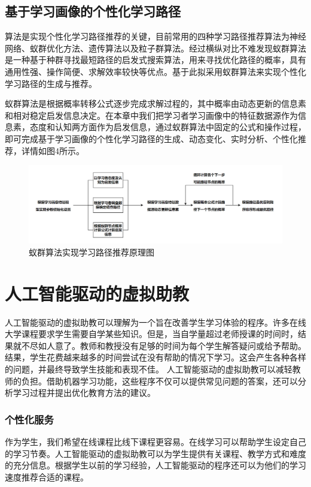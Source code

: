 \documentclass[UTF8]{ctexart}
\begin{document}
	\subsection{基于学习画像的个性化学习路径}
		算法是实现个性化学习路径推荐的关键，目前常用的四种学习路径推荐算法为神经网络、蚁群优化方法、遗传算法以及粒子群算法。经过横纵对比不难发现蚁群算法是一种基于种群寻找最短路径的启发式搜索算法，用来寻找优化路径的概率，具有通用性强、操作简便、求解效率较快等优点。基于此拟采用蚁群算法来实现个性化学习路径的生成与推荐。

		蚁群算法是根据概率转移公式逐步完成求解过程的，其中概率由动态更新的信息素和相对稳定启发信息决定。在本章中我们把学习者学习画像中的特征数据源作为信息素，态度和认知两方面作为启发信息，通过蚁群算法中固定的公式和操作过程，即可完成基于学习画像的个性化学习路径的生成、动态变化、实时分析、个性化推荐，详情如图4所示。
		\begin{figure}[H]
			\centering
			\includegraphics[width=1\textwidth]{yiqun}
			\caption{蚁群算法实现学习路径推荐原理图}
			\end{figure}

	\section{人工智能驱动的虚拟助教}
	人工智能驱动的虚拟助教可以理解为一个旨在改善学生学习体验的程序。许多在线大学课程要求学生需要自学某些知识。但是，当自学量超过老师授课的时间时，结果就不尽如人意了。教师和教授没有足够的时间为每个学生解答疑问或给予帮助。结果，学生花费越来越多的时间尝试在没有帮助的情况下学习。这会产生各种各样的问题，并最终导致学生技能和表现不佳。
	人工智能驱动的虚拟助教可以减轻教师的负担。借助机器学习功能，这些程序不仅可以提供常见问题的答案，还可以分析学习过程并提出优化教育方法的建议。
		\subsubsection{个性化服务}
		作为学生，我们希望在线课程比线下课程更容易。在线学习可以帮助学生设定自己的学习节奏。人工智能驱动的虚拟助教可以为学生提供有关课程、教学方式和难度的充分信息。根据学生以前的学习经验，人工智能驱动的程序还可以为他们的学习速度推荐合适的课程。
\end{document}
